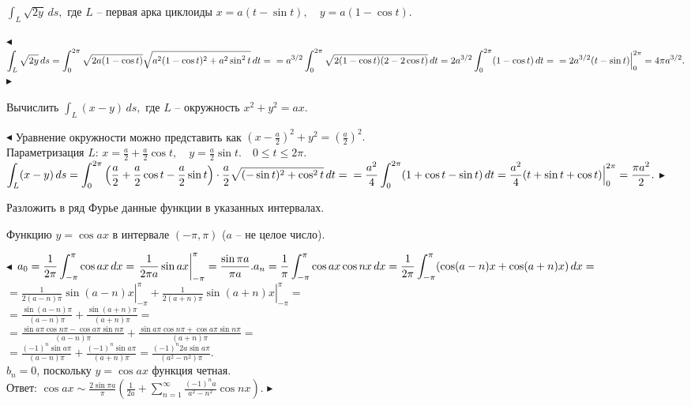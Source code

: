 \documentclass[a5paper,10pt]{article}
\begin{document}
\medskip
{} $\displaystyle \int_L\sqrt{2y}\,ds,$ где $L$ -- первая арка циклоиды
$x=a(t-\sin t),\quad y=a(1-\cos t).$

\smallskip\noindent
$\blacktriangleleft$ $\displaystyle \int_L\sqrt{2y}\,ds=\int_0^{2\pi}
\sqrt{2a(1-\cos t)}\sqrt{a^2(1-\cos t)^2+a^2\sin^2t}\,dt=\\
=a^{3/2}\int_0^{2\pi}\sqrt{2(1-\cos t)(2-2\cos t)}\,dt=2a^{3/2}\int_0^{2\pi}(1-\cos t)\,dt=\\
=2a^{3/2}(t-\sin t)\Big|_0^{2\pi}=4\pi a^{3/2}.$
$\blacktriangleright$

\medskip
{} Вычислить $\displaystyle \int_L(x-y)\,ds,$ где $L$ -- окружность $x^2+y^2=ax.$

\smallskip\noindent
$\blacktriangleleft$ Уравнение окружности можно представить как
$\displaystyle \left(x-\frac a2\right)^2+y^2=\left(\frac a2\right)^2.$\\
Параметризация $L$: $\displaystyle x=\frac a2+\frac a2\cos t,\quad y=\frac a2\sin t.\quad 0\le t\le2\pi.$\\
$\displaystyle \int_L(x-y)\,ds=\int_0^{2\pi}\left(\frac a2+\frac a2\cos t-\frac a2\sin t\right)
\cdot\frac a2\sqrt{(-\sin t)^2+\cos^2t}\,dt=\\
=\frac{a^2}{4}\int_0^{2\pi}(1+\cos t-\sin t)\,dt=\frac{a^2}{4}(t+\sin t+\cos t)\Big|_0^{2\pi}=\frac{\pi a^2}{2}.$
$\blacktriangleright$

\medskip
\noindent Разложить в ряд Фурье данные функции в указанных интервалах.

\medskip
{} Функцию $y=\cos ax$ в интервале $(-\pi,\pi)$
($a$ -- не целое число).

\smallskip
\noindent $\blacktriangleleft$
$\displaystyle a_0=\frac{1}{2\pi}\int_{-\pi}^{\pi}\cos ax\,dx=
\left.\frac{1}{2\pi a}\sin ax\right|_{-\pi}^{\pi}=\frac{\sin\pi a}{\pi a}.\\
a_n=\frac{1}{\pi}\int_{-\pi}^{\pi}\cos ax\cos nx\,dx=
\frac{1}{2\pi}\int_{-\pi}^{\pi}(\cos (a-n)x+\cos (a+n)x)\,dx=$\\
$\displaystyle =\left.\frac{1}{2(a-n)\pi}\sin (a-n)x\right|_{-\pi}^{\pi}+
\left.\frac{1}{2(a+n)\pi}\sin (a+n)x\right|_{-\pi}^{\pi}=$\\
$\displaystyle =\frac{\sin (a-n)\pi}{(a-n)\pi}+\frac{\sin (a+n)\pi}{(a+n)\pi}=$\\
$\displaystyle =\frac{\sin a\pi\cos n\pi-\cos a\pi\sin n\pi}{(a-n)\pi}+
\frac{\sin a\pi\cos n\pi+\cos a\pi\sin n\pi}{(a+n)\pi}=$\\
$\displaystyle =\frac{(-1)^n\sin a\pi}{(a-n)\pi}+\frac{(-1)^n\sin a\pi}{(a+n)\pi}=
\frac{(-1)^n2a\sin a\pi}{(a^2-n^2)\pi}$.\\
$b_n=0$, поскольку $y=\cos ax$ функция четная.\\
Ответ: $\displaystyle \cos ax\sim\frac{2\sin\pi a}{\pi}\left(\frac{1}{2a}+
\sum_{n=1}^{\infty}\frac{(-1)^na}{a^2-n^2}\cos nx\right)$.
$\blacktriangleright$
\end{document}
